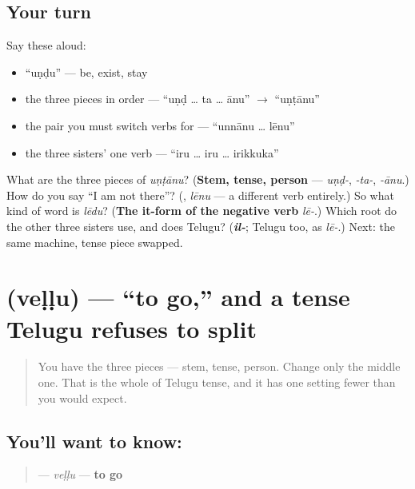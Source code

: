 \subsection*{Your turn}
Say these aloud:

\begin{itemize}
\raggedright
  \item \textquotedblleft{}uṇḍu\textquotedblright{} — be, exist, stay
  \item the three pieces in order — \textquotedblleft{}uṇḍ … ta … ānu\textquotedblright{} $\to$ \textquotedblleft{}uṇṭānu\textquotedblright{}
  \item the pair you must switch verbs for — \textquotedblleft{}unnānu … lēnu\textquotedblright{}
  \item the three sisters' one verb — \textquotedblleft{}iru … iru … irikkuka\textquotedblright{}
\end{itemize}

\begin{tcolorbox}[breakable,colback=teal!4,colframe=teal!35!black,title={Before you move on}]
What are the three pieces of \emph{uṇṭānu}? (\textbf{Stem, tense, person} — \emph{uṇḍ-}, \emph{-ta-}, \emph{-ānu}.) How do you say \textquotedblleft{}I am not there\textquotedblright{}? (\textbf{}, \emph{lēnu} — a different verb entirely.) So what kind of word is \emph{lēdu}? (\textbf{The it-form of the negative verb} \emph{lē-}.) Which root do the other three sisters use, and does Telugu? (\emph{\textbf{il-}}; Telugu too, as \emph{lē-}.) Next: the same machine, tense piece swapped.
\end{tcolorbox}
\section[\texorpdfstring{\te{వెళ్ళు} (veḷḷu)}{వెళ్ళు (veḷḷu)}]{ (veḷḷu) — \textquotedblleft{}to go,\textquotedblright{} and a tense Telugu refuses to split}

\label{lesson:TE-C32-vellu}



\begin{quote}
You have the three pieces — stem, tense, person. Change only the middle one. That is the whole of Telugu tense, and it has one setting fewer than you would expect.
\end{quote}

\subsection*{You'll want to know: }
\begin{quote}
\textbf{} — \emph{veḷḷu} — \textbf{to go}
\end{quote}

